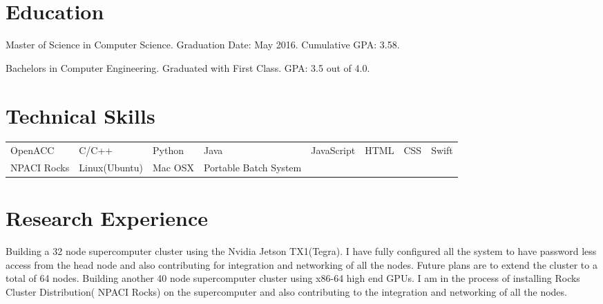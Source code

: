 \documentclass{Mihir_Kavatkar-Resume}
\begin{document}
	
	\section{Education}
		\educationinfoMasters
		{Master of Science in Computer Science.}
		{Graduation Date: May 2016.}
		{Cumulative GPA: 3.58.}
		
		\vspace*{-0.5em}
		\educationinfoBachelors
		{Bachelors in Computer Engineering. Graduated with First Class. GPA: 3.5 out of 4.0.}
		
	\section{Technical Skills}
		\begin{tabular}{l l l l l l l l}
			OpenACC & C/C++ & Python & Java & JavaScript & HTML & CSS & Swift \\
			NPACI Rocks & Linux(Ubuntu) & Mac OSX & Portable Batch System
		\end{tabular}
	
	\section{Research Experience}
		\vspace*{-0.5em}
		\workitems
		{Building a 32 node supercomputer cluster using the Nvidia Jetson TX1(Tegra). I have fully configured all the system to have password less access from the head node and also contributing for integration and networking of all the nodes. Future plans are to extend the cluster to a total of 64 nodes. }
		{Building another 40 node supercomputer cluster using x86-64 high end GPUs. I am in the process of installing Rocks Cluster Distribution( NPACI Rocks) on the supercomputer and also contributing to the integration and networking of all the nodes.}
		
\end{document}
